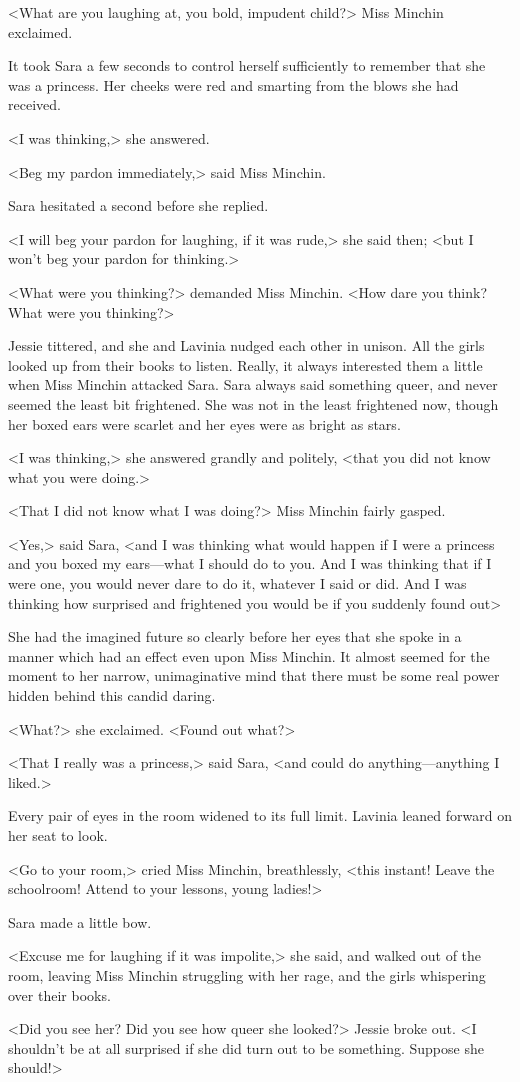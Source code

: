 <What are you laughing at, you bold, impudent child?> Miss Minchin exclaimed.

It took Sara a few seconds to control herself sufficiently to remember that she was a princess. Her cheeks were red and smarting from the blows she had received.

<I was thinking,> she answered.

<Beg my pardon immediately,> said Miss Minchin.

Sara hesitated a second before she replied.

<I will beg your pardon for laughing, if it was rude,> she said then; <but I won't beg your pardon for thinking.>

<What were you thinking?> demanded Miss Minchin. <How dare you think? What were you thinking?>

Jessie tittered, and she and Lavinia nudged each other in unison. All the girls looked up from their books to listen. Really, it always interested them a little when Miss Minchin attacked Sara. Sara always said something queer, and never seemed the least bit frightened. She was not in the least frightened now, though her boxed ears were scarlet and her eyes were as bright as stars.

<I was thinking,> she answered grandly and politely, <that you did not know what you were doing.>

<That I did not know what I was doing?> Miss Minchin fairly gasped.

<Yes,> said Sara, <and I was thinking what would happen if I were a princess and you boxed my ears—what I should do to you. And I was thinking that if I were one, you would never dare to do it, whatever I said or did. And I was thinking how surprised and frightened you would be if you suddenly found out\longdash>

She had the imagined future so clearly before her eyes that she spoke in a manner which had an effect even upon Miss Minchin. It almost seemed for the moment to her narrow, unimaginative mind that there must be some real power hidden behind this candid daring.

<What?> she exclaimed. <Found out what?>

<That I really was a princess,> said Sara, <and could do anything—anything I liked.>

Every pair of eyes in the room widened to its full limit. Lavinia leaned forward on her seat to look.

<Go to your room,> cried Miss Minchin, breathlessly, <this instant! Leave the schoolroom! Attend to your lessons, young ladies!>

Sara made a little bow.

<Excuse me for laughing if it was impolite,> she said, and walked out of the room, leaving Miss Minchin struggling with her rage, and the girls whispering over their books.

<Did you see her? Did you see how queer she looked?> Jessie broke out. <I shouldn't be at all surprised if she did turn out to be something. Suppose she should!>

